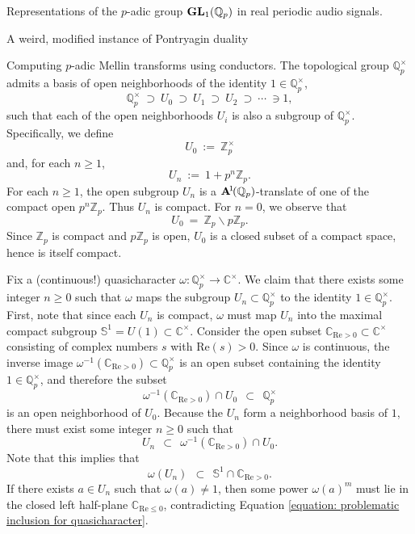 \documentclass[letterpaper,11pt, reqno]{amsart}
\newtheorem{monodromy theorem}{Monodromy Theorem}[subsection]
\newtheorem{wild conjecture}[theorem]{Wild Conjecture}
\newtheorem{research objectives}{Research objectives}[subsection]
\newtheorem{research question}[theorem]{Research questions}
\newtheorem{aside question}[theorem]{Aside question}
\newtheorem{audio example}[theorem]{\loudspeaker[3] Example}
\newtheorem{blank remark}[theorem]{}
\newtheorem{terminology and comment}[theorem]{Terminology and comment}
\newtheorem{purity hypothesis}[theorem]{Purity hypothesis}
\newtheorem{corollary of the purity hypothesis}[theorem]{Corollary of the purity hypothesis}
\newcommand{\CC} {{\mathbb C}}
\newcommand{\QQ} {{\mathbb Q}}
\newcommand{\ZZ} {{\mathbb Z}}
\newcommand{\lra}{{\longrightarrow}}
\numberwithin{equation}{theorem}
\begin{document}
\begin{section}{Representations of the $p$-adic group $\bold{GL}_{1}(\mathbb{Q}_{p})$
in real periodic audio signals.}
\begin{subsection}{ A weird, modified instance of Pontryagin duality}
\end{subsection}

\begin{subsection}{Computing $p$-adic Mellin transforms using conductors.}
The topological group $\QQ^\times_p$ admits a basis of open neighborhoods of the identity $1\in\QQ^\times_p$,
	$$
	\QQ^\times_p\ \supset\ U_0\ \supset\ U_1\ \supset\ U_2\ \supset\ \cdots\ \ni 1,
	$$
such that each of the open neighborhoods $U_{i}$ is also a subgroup of $\QQ^\times_p$. Specifically, we define
	$$
	U_{0}\ :=\ \ZZ^{\times}_{p}
	$$
and, for each $n\ge 1$,
	$$
	U_{n}
	\ :=\ 
	1+p^n\ZZ_p.
	$$
For each $n\ge1$, the open subgroup $U_{n}$ is a $\bold{A}^{\!1\!}(\QQ_{p})$-translate of one of the compact open $p^n\ZZ_{p}$. Thus $U_n$ is compact. For $n=0$, we observe that
	$$
	U_0
	\ =\ 
	\ZZ_p\smallsetminus p\ZZ_p.
	$$
Since $\ZZ_p$ is compact and $p\ZZ_p$ is open, $U_0$ is a closed subset of a compact space, hence is itself compact.

	Fix a (continuous!) quasicharacter $\omega:\QQ^\times_p\lra\CC^\times$. We claim that there exists some integer $n\ge 0$ such that $\omega$ maps the subgroup $U_{n}\subset\QQ^\times_p$ to the identity $1\in\QQ^\times_p$. First, note that since each $U_{n}$ is compact, $\omega$ must map $U_n$ into the maximal compact subgroup $\mathbb{S}^1=U(1)\subset\CC^\times$. Consider the open subset $\CC_{\text{Re}>0}\subset\CC^\times$ consisting of complex numbers $s$ with $\text{Re}(s)>0$. Since $\omega$ is continuous, the inverse image $\omega^{-1}(\CC_{\text{Re}>0})\subset\QQ^\times_p$ is an open subset containing the identity $1\in\QQ^\times_p$, and therefore the subset
	$$
	\omega^{-1}(\CC_{\text{Re}>0})\cap U_0
	\ \ \subset\ \ 
	\QQ^\times_p
	$$
is an open neighborhood of $U_0$. Because the $U_n$ form a neighborhood basis of $1$, there must exist some integer $n\ge 0$ such that
	$$
	U_{n}
	\ \ \subset\ \ 
	\omega^{-1}(\CC_{\text{Re}>0})\cap U_0.
	$$
Note that this implies that
	\begin{equation}\label{equation: problematic inclusion for quasicharacter}
	\omega(U_n)
	\ \ \subset\ \ 
	\mathbb{S}^{1}\cap\CC_{\text{Re}>0}.
	\end{equation}
If there exists $a\in U_n$ such that $\omega(a)\ne 1$, then some power $\omega(a)^m$ must lie in the closed left half-plane $\CC_{\text{Re}\le 0}$, contradicting Equation \eqref{equation: problematic inclusion for quasicharacter}.


\end{subsection}
\end{section}
\end{document}
